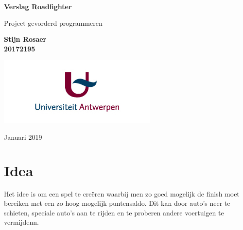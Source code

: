 \documentclass[12pt,a4paper]{article}
\begin{document}
\begin{titlepage}
   \begin{center}
       \vspace*{1cm}
 
       \textbf{{\huge Verslag Roadfighter}}
 
       \vspace{0.5cm}
        Project gevorderd programmeren
 
       \vspace{1.5cm}
 
       \textbf{{\Large Stijn Rosaer}\\20172195}
  
       \vspace{10cm}
 
       \includegraphics[scale=0.4]{img/logoua.jpg}

       Januari 2019
 
   \end{center}
\end{titlepage}
\newpage

\section{Idea}
Het idee is om een spel te cre\"eren waarbij men zo goed mogelijk de finish moet bereiken met een zo hoog mogelijk puntensaldo. Dit kan door auto's neer te schieten, speciale auto's aan te rijden en te proberen andere voertuigen te vermijdenn.
\end{document}

